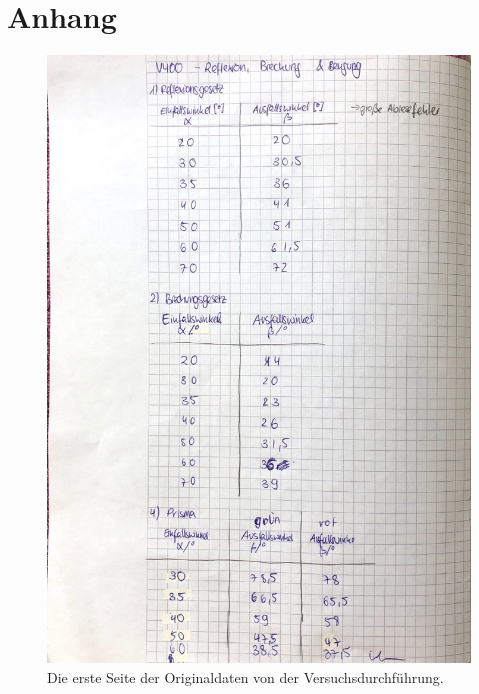 \section{Anhang}
\label{sec:anhang}

\begin{figure}
    \centering
    \includegraphics[width=\textwidth]{bilder/Data1_v400.pdf}
    \caption{Die erste Seite der Originaldaten von der Versuchsdurchführung.}
    \label{fig:originaldaten1}
\end{figure}

